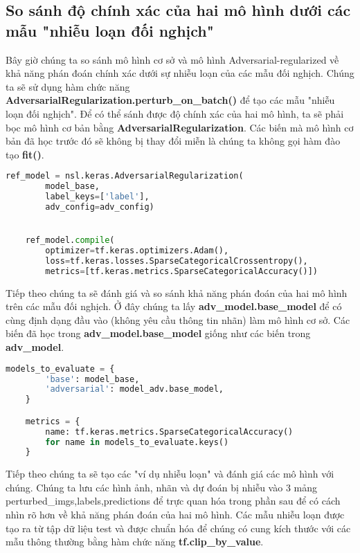 \subsection{So sánh độ chính xác của hai mô hình dưới các mẫu "nhiễu loạn đối nghịch"}

Bây giờ chúng ta so sánh mô hình cơ sở và mô hình Adversarial-regularized về khả năng phán đoán chính xác dưới sự nhiễu loạn của các mẫu đối nghịch.
Chúng ta sẽ sử dụng hàm chức năng \textbf{AdversarialRegularization.perturb\_on\_batch()} để tạo các mẫu "nhiễu loạn đối nghịch". Để có thể sánh được độ chính xác của hai mô hình,
ta sẽ phải bọc mô hình cơ bản bằng \textbf{AdversarialRegularization}. Các biến mà mô hình cơ bản đã học trước đó sẽ không bị thay đổi miễn là chúng ta không gọi hàm đào tạo \textbf{fit()}.

\begin{lstlisting}[language = Python]
    ref_model = nsl.keras.AdversarialRegularization(
        model_base,
        label_keys=['label'],
        adv_config=adv_config)


    ref_model.compile(
        optimizer=tf.keras.optimizers.Adam(),
        loss=tf.keras.losses.SparseCategoricalCrossentropy(),
        metrics=[tf.keras.metrics.SparseCategoricalAccuracy()])
\end{lstlisting}

Tiếp theo chúng ta sẽ đánh giá và so sánh khả năng phán đoán của hai mô hình trên các mẫu đối nghịch.
Ở đây chúng ta lấy \textbf{adv\_model.base\_model} để có cùng định dạng đầu vào (không yêu cầu thông tin nhãn) làm mô hình cơ sở. Các biến đã học trong \textbf{adv\_model.base\_model} giống như các biến 
trong \textbf{adv\_model}.

\begin{lstlisting}[language = Python]
    models_to_evaluate = {
        'base': model_base,
        'adversarial': model_adv.base_model,
    }

    metrics = {
        name: tf.keras.metrics.SparseCategoricalAccuracy()
        for name in models_to_evaluate.keys()
    }    
\end{lstlisting}

Tiếp theo chúng ta sẽ tạo các "ví dụ nhiễu loạn" và đánh giá các mô hình với chúng. Chúng ta lưu các hình ảnh, nhãn và dự đoán bị nhiễu vào 3 mảng perturbed\_imgs,labels,predictions để trực 
quan hóa trong phần sau để có cách nhìn rõ hơn về khả năng phán đoán của hai mô hình. Các mẫu nhiễu loạn được tạo ra từ tập dữ liệu test và
được chuẩn hóa để chúng có cung kích thước với các mẫu thông thường bằng hàm chức năng \textbf{tf.clip\_by\_value}.


